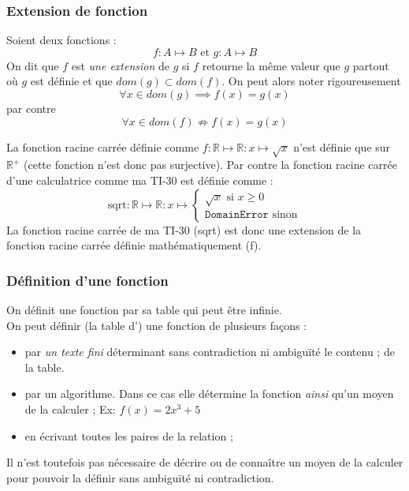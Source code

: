 \begin{myexem}
\subsubsection{Extension de fonction}
\begin{mydef}
    Soient deux fonctions : $$ f : A \mapsto B \text{ et } g : A \mapsto B$$ On dit que $f$ est \emph{une extension} de $g$ si $f$ retourne la même valeur que $g$ partout où $g$ est définie et que $dom(g) \subset dom(f)$. On peut alors noter rigoureusement $$ \forall x \in dom(g) \implies f(x) = g(x)$$ par contre 
    $$ \forall x \in dom(f) \nRightarrow f(x) = g(x) $$
\end{mydef}
\vspace{0.3cm}
\begin{myexem}
    La fonction racine carrée définie comme $f : \mathbb{R} \mapsto \mathbb{R} : x \mapsto \sqrt{x}$ n'est définie que sur $\mathbb{R}^+$ (cette fonction n'est donc pas surjective). Par contre la fonction racine carrée d'une calculatrice comme ma TI-30 est définie comme :
    $$ \text{sqrt} : \mathbb{R} \mapsto \mathbb{R} : x \mapsto \begin{cases}
    \sqrt{x} \text{ si } x \geq 0 \\
    \texttt{DomainError } \text{sinon}
    \end{cases}
    $$
    La fonction racine carrée de ma TI-30 (sqrt) est donc une extension de la fonction racine carrée définie mathématiquement (f).
\end{myexem}

\subsubsection{Définition d'une fonction}
\label{par:d_finition_d_une_fonciton}
On définit une fonction par sa table qui peut être infinie.\\
On peut définir (la table d') une fonction de plusieurs façons :
\begin{itemize}
	\item par \emph{un texte fini} déterminant sans contradiction ni ambiguïté le contenu ;
		de la table.
	\item par un algorithme. Dans ce cas elle détermine la fonction \textit{ainsi} qu'un moyen de la calculer ;
		\subitem Ex: $f(x) = 2x^3+5$
	\item en écrivant toutes les paires de la relation ;
\end{itemize}
Il n'est toutefois pas nécessaire de décrire ou de connaître un moyen de la calculer
pour pouvoir la définir sans ambiguïté ni contradiction.


\end{myexem}
